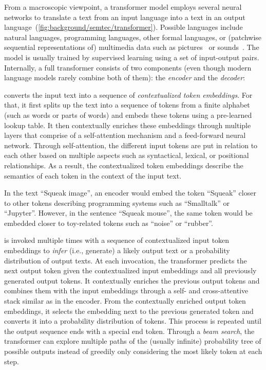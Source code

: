 From a macroscopic viewpoint, a transformer model employs several neural networks to translate a text from an input language into a text in an output language~(\cref{fig:background/semtec/transformer}).
Possible languages include natural languages, programming languages, other formal languages, or (patchwise sequential representations of) multimedia data such as pictures~\cite{dosovitskiy2021image} or sounds~\cite{gong2021ast}.
The model is usually trained by supervised learning using a set of input-output pairs.
Internally, a full transformer consists of two components (even though modern language models rarely combine both of them): the \emph{encoder} and the \emph{decoder}:
%
\begin{description}[noextralabelsep]
	\item[The encoder] converts the input text into a sequence of \emph{contextualized token embeddings}.
	For that, it first splits up the text into a sequence of tokens from a finite alphabet (such as words or parts of words) and embeds these tokens using a pre-learned lookup table.
	It then contextually enriches these embeddings through multiple layers that comprise of a self-attention mechanism and a feed-forward neural network.
	Through self-attention, the different input tokens are put in relation to each other based on multiple aspects such as syntactical, lexical, or positional relationships.
	As a result, the contextualized token embeddings describe the semantics of each token in the context of the input text.

	\begin{example}
		In the text ``Squeak image'', an encoder would embed the token ``Squeak'' closer to other tokens describing programming systems such as ``Smalltalk'' or ``Jupyter''.
		However, in the sentence ``Squeak mouse'', the same token would be embedded closer to toy-related tokens such as ``noise'' or ``rubber''.
	\end{example}

	\item[The decoder] is invoked multiple times with a sequence of contextualized input token embeddings to \emph{infer} (i.e., generate) a likely output text or a probability distribution of output texts.
	At each invocation, the transformer predicts the next output token given the contextualized input embeddings and all previously generated output tokens.
	It contextually enriches the previous output tokens and combines them with the input embeddings through a self- and cross-attentive stack similar as in the encoder.
	From the contextually enriched output token embeddings, it selects the embedding next to the previous generated token and converts it into a probability distribution of tokens.
	This process is repeated until the output sequence ends with a special end token.
	Through a \emph{beam search}, the transformer can explore multiple paths of the (usually infinite) probability tree of possible outputs instead of greedily only considering the most likely token at each step.


\end{description}
